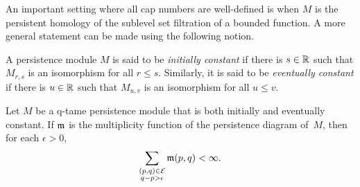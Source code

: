 An important setting where all cap numbers are well-defined is when $M$ is the persistent homology of the sublevel set filtration of a bounded function.
A more general statement can be made using the following notion.

\begin{defi} \label{d:initially and eventually constant}
	A persistence module $M$ is said to be \emph{initially constant} if there is $s \in \mathbb{R}$ such that $M_{r,s}$ is an isomorphism for all $r \leq s$.
	Similarly, it is said to be \emph{eventually constant} if there is $u \in \mathbb{R}$
	such that $M_{u,v}$ is an isomorphism for all $u \leq v$.
\end{defi}

\begin{thm} \label{t:cap numbers well defined}
	Let $M$ be a q-tame persistence module that is both initially and eventually constant.
	If $\mathfrak{m}$ is the multiplicity function of the persistence diagram of~$M$,
	then for each $\epsilon > 0$,
	\begin{equation*}
	\sum_{ \substack{ (p,q) \in \mathcal{E} \\ q-p > \epsilon } } \mathfrak{m} (p,q) < \infty.
	\end{equation*}
\end{thm}

